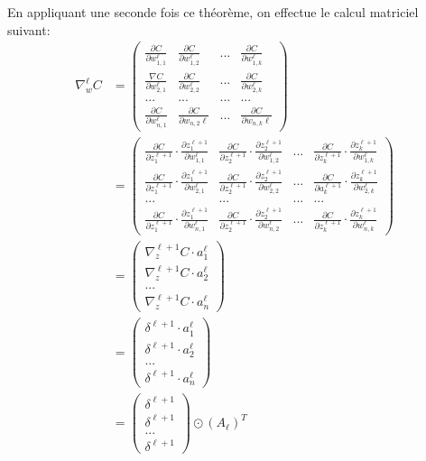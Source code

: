 \documentclass[10pt,a4paper,titlepage]{article}
\begin{document}
En appliquant une seconde fois ce théorème, on effectue le calcul matriciel suivant:
\begin{align*}
\nabla_w^\ell C &= \begin{pmatrix} \frac{\partial C}{\partial w_{1, 1}^\ell} & \frac{\partial C}{\partial w_{1,2}^\ell} & ... & \frac{\partial C}{\partial w_{1,k}^\ell} \\ \frac{\nabla C}{\partial w_{2,1}^{\ell}} & \frac{\partial C}{\partial w_{2,2}^{\ell}} & ... & \frac{\partial C}{\partial w_{2,k}^{\ell}} \\
... & ... & ... & ... \\
\frac{\partial C}{\partial w_{n,1}^\ell} & \frac{\partial C}{\partial w_{n,2}\ell} & ... & \frac{\partial C}{\partial w_{n,k}\ell}
\end{pmatrix} \\
&=\begin{pmatrix} \frac{\partial C}{\partial z_1^{\ell+1}} \cdot \frac{\partial z_1^{\ell+1}}{\partial w_{1, 1}^\ell} & \frac{\partial C}{\partial z_2^{\ell+1}} \cdot \frac{\partial z_2^{\ell+1}}{\partial w_{1, 2}^\ell} & ... & \frac{\partial C}{\partial z_k^{\ell+1}} \cdot \frac{\partial z_k^{\ell+1}}{\partial w_{1, k}^\ell} \\ 
\frac{\partial C}{\partial z_1^{\ell+1}} \cdot \frac{\partial z_1^{\ell+1}}{\partial w_{2, 1}^\ell} & \frac{\partial C}{\partial z_2^{\ell+1}} \cdot \frac{\partial z_2^{\ell+1}}{\partial w_{2, 2}^\ell} & ... & \frac{\partial C}{\partial a_k^{\ell+1}} \cdot \frac{\partial z_k^{\ell+1}}{\partial w_{2, k}^\ell} \\
... & ... & ... & ... \\
\frac{\partial C}{\partial z_1^{\ell+1}} \cdot \frac{\partial z_1^{\ell+1}}{\partial w_{n, 1}^\ell} & \frac{\partial C}{\partial z_2^{\ell+1}} \cdot \frac{\partial z_2^{\ell+1}}{\partial w_{n, 2}^\ell} & ... & \frac{\partial C}{\partial z_k^{\ell+1}} \cdot \frac{\partial z_k^{\ell+1}}{\partial w_{n, k}^\ell}
\end{pmatrix} \\
&=\begin{pmatrix}
\nabla_z^{\ell+1}C \cdot a_1^\ell \\
\nabla_z^{\ell+1}C \cdot a_2^\ell \\
... \\
\nabla_z^{\ell+1}C \cdot a_n^\ell
\end{pmatrix} \\
&=\begin{pmatrix}
\delta^{\ell+1} \cdot a_1^\ell \\
\delta^{\ell+1} \cdot a_2^\ell \\
... \\
\delta^{\ell+1} \cdot a_n^\ell
\end{pmatrix} \\
&= \begin{pmatrix}
\delta^{\ell+1}\\
\delta^{\ell+1}\\
... \\
\delta^{\ell + 1}
\end{pmatrix} \odot (A_\ell)^T
\end{align*}
\end{document}
